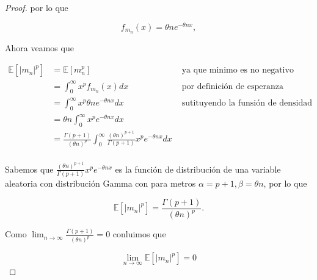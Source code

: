 \documentclass[letterpaper]{article}
\theoremstyle{definition}
\theoremstyle{lemathm}
\theoremstyle{lemademthm}
\newcommand{\limninf}{\lim_{n\to\infty}}
\newcommand{\pars}[1]{\left( #1 \right) }
\newcommand{\bracs}[1]{\left[ #1 \right] }
\newcommand{\1}{\mathbbm{1}}
\begin{document}
\begin{enumerate}
\begin{proof}
			por lo que

			\[f_{m_n}(x) = \theta n e^{-\theta n x},\]

			Ahora veamos que

			\begin{align*}
				\mathbb{E}\bracs{|m_n|^p} &= \mathbb{E}\bracs{m_n^p} & \text{ ya que minimo es no negativo}\\
				&= \int_{0}^{\infty} x^p f_{m_n}(x) dx & \text{ por definición de esperanza}\\
				&= \int_{0}^{\infty} x^p \theta n e^{-\theta n x} dx  & \text{ sutituyendo la funsión de densidad}\\
				&= \theta n \int_{0}^{\infty} x^p e^{-\theta n x} dx\\
				&= \frac{\Gamma\pars{p+1}}{\pars{\theta n}^p} \int_{0}^{\infty} \frac{\pars{\theta n}^{p+1}}{\Gamma(p+1)}x^p e^{-\theta n x} dx\\
			\end{align*}

			Sabemos que $\frac{\pars{\theta n}^{p+1}}{\Gamma(p+1)}x^p e^{-\theta n x}$ es la función de distribución de una variable aleatoria con distribución Gamma con para metros $\alpha = p+1, \beta = \theta n$, por lo que

			\[\mathbb{E}\bracs{|m_n|^p} = \frac{\Gamma\pars{p+1}}{\pars{\theta n}^p}.\]

			Como $\limninf \frac{\Gamma\pars{p+1}}{\pars{\theta n}^p} = 0$ conluimos que

			\[\limninf \mathbb{E}\bracs{|m_n|^p} = 0\]
		\end{proof}

    \end{enumerate}

	
\end{document}
